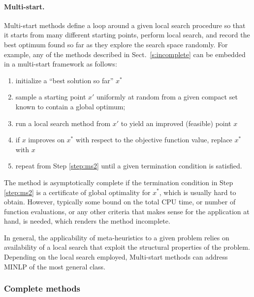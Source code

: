 \paragraph{Multi-start.}
%
Multi-start methods define a loop around a given local search procedure so that it starts from many different starting points, perform local search, and record the best optimum found so far as they explore the search space randomly. For example, any of the methods described in Sect.~\ref{s:incomplete} can be embedded in a multi-start framework as follows:
%
\begin{enumerate}
 \item initialize a ``best solution so far'' $x^\ast$
 \item sample a starting point $x'$ uniformly at random from a given compact set known to contain a global optimum; \label{step:ms2}
 \item run a local search method from $x'$ to yield an improved (feasible) point $x$
 \item if $x$ improves on $x^\ast$ with respect to the objective function value, replace $x^\ast$ with $x$
 \item repeat from Step \ref{step:ms2} until a given termination condition is satisfied. \label{step:ms5}
\end{enumerate}
%
The method is asymptotically complete if the termination condition in Step \ref{step:ms2} is a certificate of global optimality for $x^\ast$, which is usually hard to obtain. However, typically some bound on the total CPU time, or number of function evaluations, or any other criteria that makes sense for the application at hand, is needed, which renders the method incomplete.

In general, the applicability of meta-heuristics to a given problem relies on availability of a local search that exploit the structural properties of the problem.
Depending on the local search employed, Multi-start methods can address MINLP of the most general class.

\subsubsection{Complete methods}\label{s:complete}

